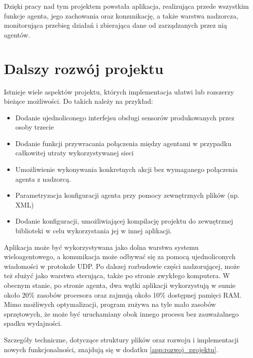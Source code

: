 Dzięki pracy nad tym projektem powstała aplikacja, realizująca przede wszystkim funkcje agenta, jego zachowania oraz komunikację, a także warstwa nadzorcza, monitorująca przebieg działań i zbierająca dane od zarządzanych przez nią agentów.

\section{Dalszy rozwój projektu}

Istnieje wiele aspektów projektu, których implementacja ułatwi lub rozszerzy bieżące możliwości. Do takich należy na przykład:
\begin{itemize}
    \item Dodanie ujednoliconego interfejsu obsługi sensorów produkowanych przez osoby trzecie
    \item Dodanie funkcji przywracania połączenia między agentami w przypadku całkowitej utraty wykorzystywanej sieci
    \item Umożliwienie wykonywania konkretnych akcji bez wymaganego połączenia agenta z nadzorcą.
    \item Parametryzacja konfiguracji agenta przy pomocy zewnętrznych plików (np. XML)
    \item Dodanie konfiguracji, umożliwiającej kompilację projektu do zewnętrznej biblioteki w celu wykorzystania jej w innej aplikacji.
\end{itemize}

Aplikacja może być wykorzystywana jako dolna warstwa systemu wieloagentowego, a komunikacja może odbywać się za pomocą ujednoliconych wiadomości w protokole UDP. Po dalszej rozbudowie części nadzorującej, może też służyć jako warstwa sterująca, także po stronie zwykłego komputera. W obecnym stanie, po stronie agenta, dwa wątki aplikacji wykorzystują w sumie około 20\% zasobów procesora oraz zajmują około 10\% dostępnej pamięci RAM. Mimo możliwych optymalizacji, program zużywa na tyle mało zasobów sprzętowych, że może być uruchamiany obok innego procesu bez zauważalnego spadku wydajności.

Szczegóły techniczne, dotyczące struktury plików oraz rozwoju i implementacji nowych funkcjonalności, znajdują się w dodatku \ref{app:rozwoj_projektu}.

